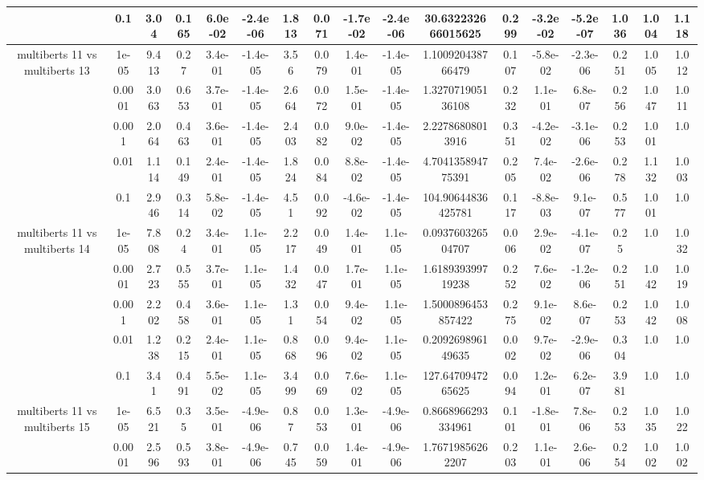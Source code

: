 \begin{tabular}{|c|c|c|c|c|c|c|c|c|c|c|c|c|c|c|c|c|}
 & 0.1 & 3.04 & 0.165 & 6.0e-02 & -2.4e-06 & 1.813 & 0.071 & -1.7e-02 & -2.4e-06 & 30.632232666015625 & 0.299 & -3.2e-02 & -5.2e-07 & 1.036 & 1.004 & 1.118 \\
\hline
\multirow{5}{*}{multiberts 11 vs multiberts 13} & 1e-05 & 9.413 & 0.27 & 3.4e-01 & -1.4e-05 & 3.56 & 0.079 & 1.4e-01 & -1.4e-05 & 1.100920438766479 & 0.107 & -5.8e-02 & -2.3e-06 & 0.251 & 1.005 & 1.012 \\
 & 0.0001 & 3.063 & 0.653 & 3.7e-01 & -1.4e-05 & 2.664 & 0.072 & 1.5e-01 & -1.4e-05 & 1.327071905136108 & 0.232 & 1.1e-01 & 6.8e-07 & 0.256 & 1.047 & 1.011 \\
 & 0.001 & 2.064 & 0.463 & 3.6e-01 & -1.4e-05 & 2.403 & 0.082 & 9.0e-02 & -1.4e-05 & 2.22786808013916 & 0.351 & -4.2e-02 & -3.1e-06 & 0.253 & 1.001 & 1.0 \\
 & 0.01 & 1.114 & 0.149 & 2.4e-01 & -1.4e-05 & 1.824 & 0.084 & 8.8e-02 & -1.4e-05 & 4.704135894775391 & 0.205 & 7.4e-02 & -2.6e-06 & 0.278 & 1.132 & 1.003 \\
 & 0.1 & 2.946 & 0.314 & 5.8e-02 & -1.4e-05 & 4.51 & 0.092 & -4.6e-02 & -1.4e-05 & 104.90644836425781 & 0.117 & -8.8e-03 & 9.1e-07 & 0.577 & 1.001 & 1.0 \\
\hline
\multirow{5}{*}{multiberts 11 vs multiberts 14} & 1e-05 & 7.808 & 0.24 & 3.4e-01 & 1.1e-05 & 2.217 & 0.049 & 1.4e-01 & 1.1e-05 & 0.093760326504707 & 0.006 & 2.9e-02 & -4.1e-07 & 0.25 & 1.0 & 1.032 \\
 & 0.0001 & 2.723 & 0.555 & 3.7e-01 & 1.1e-05 & 1.432 & 0.047 & 1.7e-01 & 1.1e-05 & 1.618939399719238 & 0.252 & 7.6e-02 & -1.2e-06 & 0.251 & 1.042 & 1.019 \\
 & 0.001 & 2.202 & 0.458 & 3.6e-01 & 1.1e-05 & 1.31 & 0.054 & 9.4e-02 & 1.1e-05 & 1.5000896453857422 & 0.275 & 9.1e-02 & 8.6e-07 & 0.253 & 1.042 & 1.008 \\
 & 0.01 & 1.238 & 0.215 & 2.4e-01 & 1.1e-05 & 0.868 & 0.096 & 9.4e-02 & 1.1e-05 & 0.209269896149635 & 0.002 & 9.7e-02 & -2.9e-06 & 0.304 & 1.0 & 1.0 \\
 & 0.1 & 3.41 & 0.491 & 5.5e-02 & 1.1e-05 & 3.499 & 0.069 & 7.6e-02 & 1.1e-05 & 127.6470947265625 & 0.094 & 1.2e-01 & 6.2e-07 & 3.981 & 1.0 & 1.0 \\
\hline
\multirow{5}{*}{multiberts 11 vs multiberts 15} & 1e-05 & 6.521 & 0.35 & 3.5e-01 & -4.9e-06 & 0.87 & 0.053 & 1.3e-01 & -4.9e-06 & 0.8668966293334961 & 0.101 & -1.8e-01 & 7.8e-06 & 0.253 & 1.035 & 1.022 \\
 & 0.0001 & 2.596 & 0.593 & 3.8e-01 & -4.9e-06 & 0.745 & 0.059 & 1.4e-01 & -4.9e-06 & 1.76719856262207 & 0.203 & 1.1e-01 & 2.6e-06 & 0.254 & 1.002 & 1.002 \\

\end{tabular}

